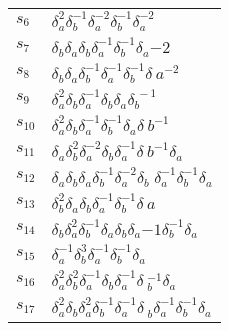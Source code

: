\documentclass{article}
\begin{document}
\begin{center}
\begin{tabular}{ll}
$s_{6}$ & $\delta_a^{2}\delta_b^{-1}\delta_a^{-2}\delta_b^{-1}\delta_a^{-2}$ \\
$s_{7}$ & $\delta_b^{}\delta_a^{}\delta_b^{}\delta_a^{-1}\delta_b^{-1}\delta_a^\
{-2}$ \\
$s_{8}$ & $\delta_b^{}\delta_a^{}\delta_b^{-1}\delta_a^{-1}\delta_b^{-1}\delta_\
a^{-2}$ \\
$s_{9}$ & $\delta_a^{2}\delta_b^{}\delta_a^{-1}\delta_b^{}\delta_a^{}\delta_b^{\
-1}$ \\
$s_{10}$ & $\delta_a^{2}\delta_b^{}\delta_a^{-1}\delta_b^{-1}\delta_a^{}\delta_\
b^{-1}$ \\
$s_{11}$ & $\delta_a^{}\delta_b^{2}\delta_a^{-2}\delta_b^{}\delta_a^{-1}\delta_\
b^{-1}\delta_a^{}$ \\
$s_{12}$ & $\delta_a^{}\delta_b^{}\delta_a^{}\delta_b^{-1}\delta_a^{-2}\delta_b\
^{}\delta_a^{-1}\delta_b^{-1}\delta_a^{}$ \\
$s_{13}$ & $\delta_b^{2}\delta_a^{}\delta_b^{}\delta_a^{-1}\delta_b^{-1}\delta_\
a^{}$ \\
$s_{14}$ & $\delta_b^{}\delta_a^{2}\delta_b^{-1}\delta_a^{}\delta_b^{}\delta_a^\
{-1}\delta_b^{-1}\delta_a^{}$ \\
$s_{15}$ & $\delta_a^{-1}\delta_b^{3}\delta_a^{-1}\delta_b^{-1}\delta_a^{}$ \\
$s_{16}$ & $\delta_a^{2}\delta_b^{2}\delta_a^{-1}\delta_b^{}\delta_a^{-1}\delta\
_b^{-1}\delta_a^{}$ \\
$s_{17}$ & $\delta_a^{2}\delta_b^{}\delta_a^{2}\delta_b^{-1}\delta_a^{-1}\delta\
_b^{}\delta_a^{-1}\delta_b^{-1}\delta_a^{}$ \\
\bottomrule
\end{tabular}
\end{center}

\thispagestyle{empty}
\end{document}
